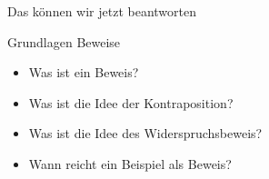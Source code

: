 \begin{frame}[fragile]{Das können wir jetzt beantworten}
	\begin{alertblock}{Grundlagen Beweise}
		\begin{itemize}
			\item Was ist ein Beweis?
			\item Was ist die Idee der Kontraposition?
			\item Was ist die Idee des Widerspruchsbeweis?
			\item Wann reicht ein Beispiel als Beweis?
		\end{itemize}
	\end{alertblock}
\end{frame}